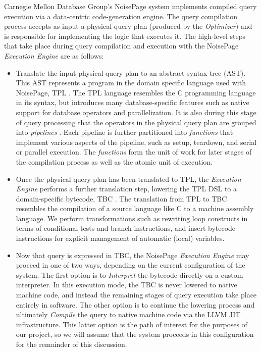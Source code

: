 \documentclass{vldb}
\begin{document}
Carnegie Mellon Database Group's NoisePage system implements compiled query execution via a data-centric code-generation engine. The query compilation process accepts as input a physical query plan (produced by the \textit{Optimizer}) and is responsible for implementing the logic that executes it. The high-level steps that take place during query compilation and execution with the NoisePage \textit{Execution Engine} are as follows:

\begin{itemize}
    \item Translate the input physical query plan to an abstract syntax tree (AST). This AST represents a program in the domain specific language used with NoisePage, TPL \cite{pcq}. The TPL language resembles the C programming language in its syntax, but introduces many database-specific features such as native support for database operators and parallelization. It is also during this stage of query processing that the operators in the physical query plan are grouped into \textit{pipelines} \cite{rof}. Each pipeline is further partitioned into \textit{functions} that implement various aspects of the pipeline, such as setup, teardown, and serial or parallel execution. The \textit{functions} form the unit of work for later stages of the compilation process as well as the atomic unit of execution.
    \item Once the physical query plan has been translated to TPL, the \textit{Execution Engine} performs a further translation step, lowering the TPL DSL to a domain-specific bytecode, TBC \cite{pcq}. The translation from TPL to TBC resembles the compilation of a source language like C to a machine assembly language. We perform transformations such as rewriting loop constructs in terms of conditional tests and branch instructions, and insert bytecode instructions for explicit management of automatic (local) variables.
    \item Now that query is expressed in TBC, the NoisePage \textit{Execution Engine} may proceed in one of two ways, depending on the current configuration of the system. The first option is to \textit{Interpret} the bytecode directly on a custom interpreter. In this execution mode, the TBC is never lowered to native machine code, and instead the remaining stages of query execution take place entirely in software. The other option is to continue the lowering process and ultimately \textit{Compile} the query to native machine code via the LLVM JIT infrastructure. This latter option is the path of interest for the purposes of our project, so we will assume that the system proceeds in this configuration for the remainder of this discussion.

\end{itemize}
\end{document}
